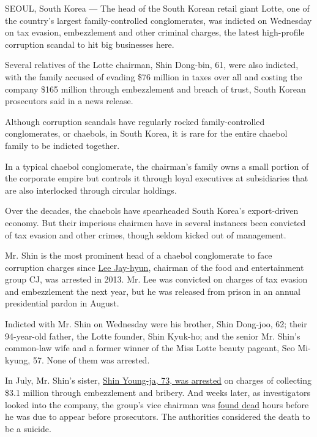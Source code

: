 SEOUL, South Korea --- The head of the South Korean retail giant Lotte,
one of the country's largest family-controlled conglomerates, was
indicted on Wednesday on tax evasion, embezzlement and other criminal
charges, the latest high-profile corruption scandal to hit big
businesses here.

Several relatives of the Lotte chairman, Shin Dong-bin, 61, were also
indicted, with the family accused of evading \$76 million in taxes over
all and costing the company \$165 million through embezzlement and
breach of trust, South Korean prosecutors said in a news release.

Although corruption scandals have regularly rocked family-controlled
conglomerates, or chaebols, in South Korea, it is rare for the entire
chaebol family to be indicted together.

In a typical chaebol conglomerate, the chairman's family owns a small
portion of the corporate empire but controls it through loyal executives
at subsidiaries that are also interlocked through circular holdings.

Over the decades, the chaebols have spearheaded South Korea's
export-driven economy. But their imperious chairmen have in several
instances been convicted of tax evasion and other crimes, though seldom
kicked out of management.

Mr. Shin is the most prominent head of a chaebol conglomerate to face
corruption charges since
\href{http://www.nytimes.com/2013/07/03/business/global/south-korean-executives-arrest-seen-as-move-to-tame-conglomerates.html}{Lee
Jay-hyun}, chairman of the food and entertainment group CJ, was arrested
in 2013. Mr. Lee was convicted on charges of tax evasion and
embezzlement the next year, but he was released from prison in an annual
presidential pardon in August.

Indicted with Mr. Shin on Wednesday were his brother, Shin Dong-joo, 62;
their 94-year-old father, the Lotte founder, Shin Kyuk-ho; and the
senior Mr. Shin's common-law wife and a former winner of the Miss Lotte
beauty pageant, Seo Mi-kyung, 57. None of them was arrested.

In July, Mr. Shin's sister,
\href{http://www.bloomberg.com/news/articles/2016-07-06/lotte-heiress-arrested-in-south-korea-amid-bribery-investigation}{Shin
Young-ja, 73, was arrested} on charges of collecting \$3.1 million
through embezzlement and bribery. And weeks later, as investigators
looked into the company, the group's vice chairman was
\href{http://www.nytimes.com/2016/08/27/business/international/south-korea-lotte-lee-in-won.html}{found
dead} hours before he was due to appear before prosecutors. The
authorities considered the death to be a suicide.

